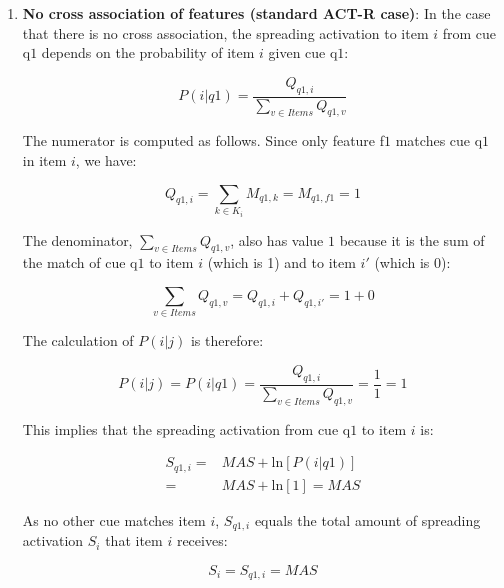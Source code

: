\documentclass{cambridge7A}\usepackage[]{graphicx}\usepackage[]{color}
\begin{document}
\begin{enumerate}
\item
\textbf{No cross association of features (standard ACT-R case)}:
In the case that there is no  cross association, the spreading activation to item $i$ from cue q$1$ depends on the probability of item $i$ given cue q$1$:

\begin{equation} \label{eq:newfannoxassoc2}
	P(i|q1) = \frac{Q_{q1,i}}{\sum\limits_{v\in Items} Q_{q1,v}}
\end{equation}

The numerator is computed as follows. Since only feature f$1$ matches cue q$1$ in item $i$, we have:

\begin{equation}
Q_{q1,i} = \sum_{k \in K_i} M_{q1,k} = M_{q1,f1} = 1
\end{equation}

The denominator, $\sum\limits_{v \in Items} Q_{q1,v}$, also has value $1$ because it is the sum of the match of cue q$1$ to item $i$ (which is 1) and to item $i'$ (which is 0):

\begin{equation}
\sum_{v\in Items} Q_{q1,v} = Q_{q1,i} + Q_{q1,i'} = 1 + 0 
\end{equation}

The  calculation of $P(i|j)$ is therefore:

\begin{equation}
P(i|j) =  P(i|q1) = \frac{Q_{q1,i}}{\sum\limits_{v \in Items} Q_{q1,v}} = \frac{1}{1} = 1 
\end{equation}

This implies that the spreading activation from cue q$1$ to item $i$ is:

\begin{equation}
\begin{split} 
	S_{q1,i} =& \textit{MAS} + \text{ln}[P(i|q1)] \\
	         =& \textit{MAS} + \text{ln}[1] = \textit{MAS}
\end{split}
\end{equation}

As no other cue matches item $i$, $S_{q1,i}$ equals the total amount of spreading activation $S_i$ that item $i$ receives: 

\begin{equation}
	S_{i} = S_{q1,i} = \textit{MAS} 
\end{equation}


\end{enumerate}
\end{document}

